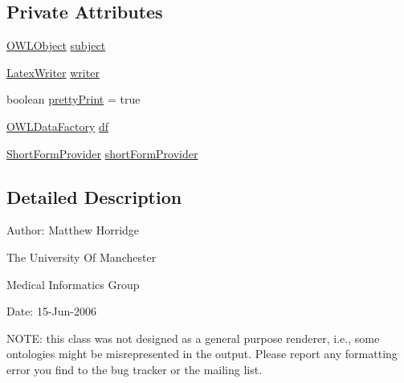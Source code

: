 \subsection*{Private Attributes}
\begin{DoxyCompactItemize}
\item 
\hyperlink{interfaceorg_1_1semanticweb_1_1owlapi_1_1model_1_1_o_w_l_object}{O\-W\-L\-Object} \hyperlink{classorg_1_1coode_1_1owlapi_1_1latex_1_1_latex_object_visitor_accd41afa75107ee74bb2f82e8ed02c2b}{subject}
\item 
\hyperlink{classorg_1_1coode_1_1owlapi_1_1latex_1_1_latex_writer}{Latex\-Writer} \hyperlink{classorg_1_1coode_1_1owlapi_1_1latex_1_1_latex_object_visitor_a58d344b81fa2c24bcab5ab55e6353171}{writer}
\item 
boolean \hyperlink{classorg_1_1coode_1_1owlapi_1_1latex_1_1_latex_object_visitor_a1e6073accdc8c64db38ea81a8a00616f}{pretty\-Print} = true
\item 
\hyperlink{interfaceorg_1_1semanticweb_1_1owlapi_1_1model_1_1_o_w_l_data_factory}{O\-W\-L\-Data\-Factory} \hyperlink{classorg_1_1coode_1_1owlapi_1_1latex_1_1_latex_object_visitor_a5cca7b483d51c448cb2e881f6b05deb9}{df}
\item 
\hyperlink{interfaceorg_1_1semanticweb_1_1owlapi_1_1util_1_1_short_form_provider}{Short\-Form\-Provider} \hyperlink{classorg_1_1coode_1_1owlapi_1_1latex_1_1_latex_object_visitor_aedfd18e1e95b651ff2b40deaaf9bc500}{short\-Form\-Provider}
\end{DoxyCompactItemize}


\subsection{Detailed Description}
Author\-: Matthew Horridge\par
 The University Of Manchester\par
 Medical Informatics Group\par
 Date\-: 15-\/\-Jun-\/2006\par
 \par


N\-O\-T\-E\-: this class was not designed as a general purpose renderer, i.\-e., some ontologies might be misrepresented in the output. Please report any formatting error you find to the bug tracker or the mailing list. 

